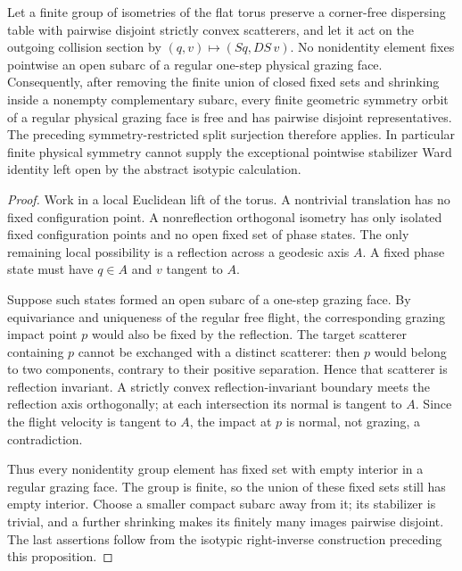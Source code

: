 \begin{proposition}
\label{prop:no_pointwise_symmetry_stabilizer_grazing_face}
Let a finite group of isometries of the flat torus preserve a corner-free
dispersing table with pairwise disjoint strictly convex scatterers, and let it
act on the outgoing collision section by
\((q,v)\mapsto(Sq,DS\,v)\).  No nonidentity element fixes pointwise an open
subarc of a regular one-step physical grazing face.  Consequently, after
removing the finite union of closed fixed sets and shrinking inside a
nonempty complementary subarc, every finite geometric symmetry orbit of a
regular physical grazing face is free and has pairwise disjoint
representatives.  The preceding symmetry-restricted split
surjection therefore
applies.  In particular finite physical symmetry cannot supply the exceptional
pointwise stabilizer Ward identity left open by the abstract isotypic
calculation.
\end{proposition}

\begin{proof}
Work in a local Euclidean lift of the torus.  A nontrivial translation has no
fixed configuration point.  A nonreflection orthogonal isometry has only
isolated fixed configuration points and no open fixed set of phase states.
The only remaining local possibility is a reflection across a geodesic axis
\(A\).  A fixed phase state must have \(q\in A\) and \(v\) tangent to \(A\).

Suppose such states formed an open subarc of a one-step grazing face.  By
equivariance and uniqueness of the regular free flight, the corresponding
grazing impact point \(p\) would also be fixed by the reflection.  The target
scatterer containing \(p\) cannot be exchanged with a distinct scatterer:
then \(p\) would belong to two components, contrary to their positive
separation.  Hence that scatterer is reflection invariant.  A strictly convex
reflection-invariant boundary meets the reflection axis orthogonally; at each
intersection its normal is tangent to \(A\).  Since the flight velocity is
tangent to \(A\), the impact at \(p\) is normal, not grazing, a contradiction.

Thus every nonidentity group element has fixed set with empty interior in a
regular grazing face.  The group is finite, so the union of these fixed sets
still has empty interior.  Choose a smaller compact subarc away from it; its
stabilizer is trivial, and a further shrinking makes its finitely many images
pairwise disjoint.  The last assertions follow from the isotypic right-inverse
construction preceding this proposition.
\end{proof}

